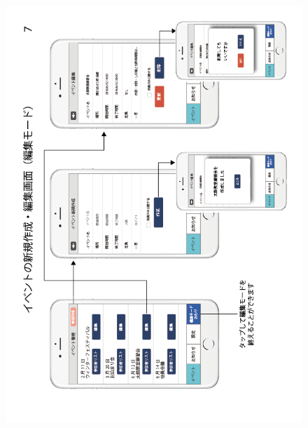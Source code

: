 \begin{figure}[h]
    \begin{center}
      \includegraphics[keepaspectratio, scale=0.7]{appendixs/appendixB_figres/fig7.png}
    \end{center}
\end{figure}

